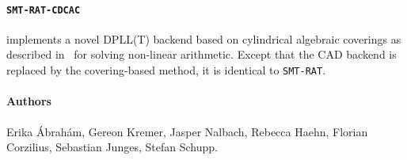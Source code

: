 \documentclass{article}
\begin{document}
\paragraph{\texttt{SMT-RAT-CDCAC}} implements a novel DPLL(T) backend based on cylindrical algebraic coverings as described in~\cite{Abraham2020} for solving non-linear arithmetic. Except that the CAD backend is replaced by the covering-based method, it is identical to \texttt{SMT-RAT}.

\paragraph{Authors}

Erika \'Abrah\'am,
Gereon Kremer,
Jasper Nalbach,
Rebecca Haehn,
Florian Corzilius,
Sebastian Junges,
Stefan Schupp.

\newpage



\end{document}
